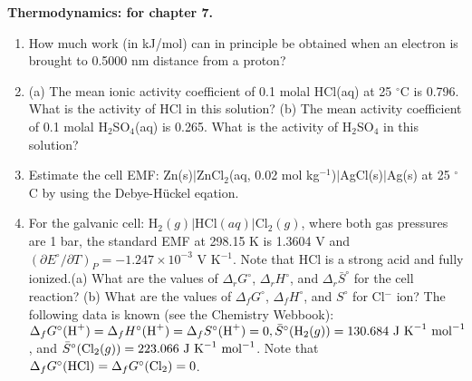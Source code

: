\noindent
\textbf{Thermodynamics:
 for chapter 7.}\\

\begin{enumerate}

\item How much work (in kJ/mol) can in principle be obtained when an electron is brought to 0.5000 nm distance from a proton?\\


\item (a) The mean ionic activity coefficient of 0.1 molal HCl(aq) at 25 $^\circ$C is 0.796. What is the activity of HCl in this solution? (b) The mean activity coefficient of 0.1 molal H$_2$SO$_4$(aq) is 0.265. What is the activity of H$_2$SO$_4$ in this solution?\\


\item Estimate the cell EMF: Zn(s)$\vert$ZnCl$_2$(aq, 0.02 mol kg$^{-1}$)$\vert$AgCl(s)$\vert$Ag(s) at 25 $^\circ$C by using the Debye-H\"uckel eqation.\\


\item For the galvanic cell: H$_2(g)\vert$HCl$(aq)\vert$Cl$_2(g)$, where both gas pressures are 1 bar, the standard EMF at 298.15 K is 1.3604 V and $\left(\partial E^\circ / \partial T\right)_P = -1.247\times 10^{-3}$ V K$^{-1}$. Note that HCl is a strong acid and fully ionized.(a) What are the values of $\Delta_rG^\circ$, $\Delta_rH^\circ$, and $\Delta_r\bar{S}^\circ$ for the cell reaction? (b) What are the values of $\Delta_fG^\circ$, $\Delta_fH^\circ$, and $S^\circ$ for Cl$^-$ ion? The following data is known (see the Chemistry Webbook): $\Delta_fG^\circ(\textnormal{H}^+) = \Delta_fH^\circ(\textnormal{H}^+) = \Delta_fS^\circ(\textnormal{H}^+) = 0, \bar{S}^\circ(\textnormal{H}_2(g)) = 130.684\textnormal{ J K}^{-1}\textnormal{ mol}^{-1}$, and $\bar{S}^\circ(\textnormal{Cl}_2(g)) = 223.066\textnormal{ J K}^{-1}\textnormal{ mol}^{-1}$. Note that $\Delta_f G^\circ(\textnormal{HCl}) = \Delta_f G^\circ(\textnormal{Cl}_2) = 0$.\\


\end{enumerate}
